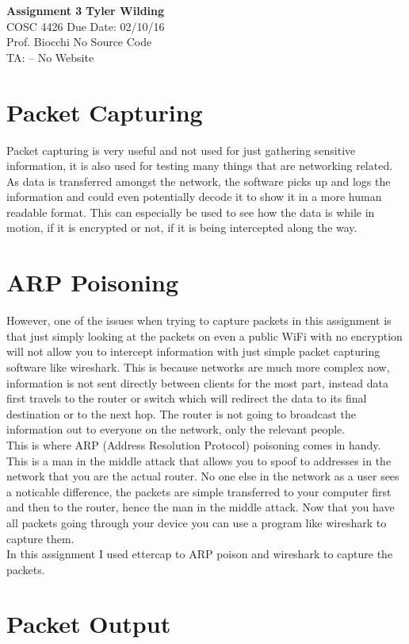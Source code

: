 \documentclass[a4paper, 11pt]{article}
\begin{document}
\noindent
\large\textbf{Assignment 3} \hfill \textbf{Tyler Wilding} \\
\normalsize COSC 4426 \hfill Due Date: 02/10/16 \\
Prof. Biocchi \hfill No Source Code \\
TA: -- \hfill No Website

\section*{Packet Capturing}
Packet capturing is very useful and not used for just gathering sensitive information, it is also used for testing many things that are networking related.  As data is transferred amongst the network, the software picks up and logs the information and could even potentially decode it to show it in a more human readable format.  This can especially be used to see how the data is while in motion, if it is encrypted or not, if it is being intercepted along the way.

\section*{ARP Poisoning}
However, one of the issues when trying to capture packets in this assignment is that just simply looking at the packets on even a public WiFi with no encryption will not allow you to intercept information with just simple packet capturing software like wireshark.  This is because networks are much more complex now, information is not sent directly between clients for the most part, instead data first travels to the router or switch which will redirect the data to its final destination or to the next hop.  The router is not going to broadcast the information out to everyone on the network, only the relevant people.\\

This is where ARP (Address Resolution Protocol) poisoning comes in handy.  This is a man in the middle attack that allows you to spoof to addresses in the network that you are the actual router.  No one else in the network as a user sees a noticable difference, the packets are simple transferred to your computer first and then to the router, hence the man in the middle attack.  Now that you have all packets going through your device you can use a program like wireshark to capture them.\\


In this assignment I used ettercap to ARP poison and wireshark to capture the packets.

\section*{Packet Output}



\end{document}
